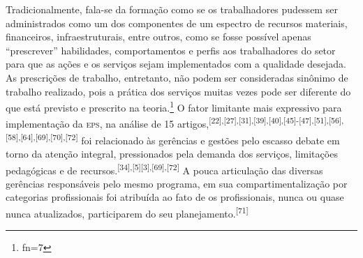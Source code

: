\documentclass{article}
\makeatletter
\newcommand{\fn}{\afterassignment\fn@aux\count0=}
\newcommand{\fn@aux}{\csname fn\the\count0\endcsname}
\makeatother
\begin{document}
Tradicionalmente, fala-se da formação como se os trabalhadores pudessem ser
administrados como um dos componentes de um espectro de recursos materiais,
financeiros, infraestruturais, entre outros, como se fosse possível apenas
“prescrever” habilidades, comportamentos e perfis aos trabalhadores do setor
para que as ações e os serviços sejam implementados com a qualidade desejada. As
prescrições de trabalho, entretanto, não podem ser consideradas sinônimo de
trabalho realizado, pois a prática dos serviços muitas vezes pode ser diferente
do que está previsto e prescrito na teoria.\footnote{\fn7}
O fator limitante mais expressivo para implementação da \textsc{eps}, na análise de 15
artigos,\textsuperscript{[}\textsuperscript{22}\textsuperscript{]}\textsuperscript{,}\textsuperscript{[}\textsuperscript{27}\textsuperscript{]}\textsuperscript{,}\textsuperscript{[}\textsuperscript{31}\textsuperscript{]}\textsuperscript{,}\textsuperscript{[}\textsuperscript{39}\textsuperscript{]}\textsuperscript{,}\textsuperscript{[}\textsuperscript{40}\textsuperscript{]}\textsuperscript{,}\textsuperscript{[}\textsuperscript{45}\textsuperscript{]}\textsuperscript{-}\textsuperscript{[}\textsuperscript{47}\textsuperscript{]}\textsuperscript{,}\textsuperscript{[}\textsuperscript{51}\textsuperscript{]}\textsuperscript{,}\textsuperscript{[}\textsuperscript{56}\textsuperscript{]}\textsuperscript{,}\textsuperscript{[}\textsuperscript{58}\textsuperscript{]}\textsuperscript{,}\textsuperscript{[}\textsuperscript{64}\textsuperscript{]}\textsuperscript{,}\textsuperscript{[}\textsuperscript{69}\textsuperscript{]}\textsuperscript{,}\textsuperscript{[}\textsuperscript{70}\textsuperscript{]}\textsuperscript{,}\textsuperscript{[}\textsuperscript{72}\textsuperscript{]}
foi relacionado às gerências e gestões pelo escasso debate em torno da atenção
integral, pressionados pela demanda dos serviços, limitações pedagógicas e de
recursos.\textsuperscript{[}\textsuperscript{34}\textsuperscript{]}\textsuperscript{,}\textsuperscript{[}\textsuperscript{5}\textsuperscript{]}\textsuperscript{[}\textsuperscript{3}\textsuperscript{]}\textsuperscript{,}\textsuperscript{[}\textsuperscript{69}\textsuperscript{]}\textsuperscript{,}\textsuperscript{[}\textsuperscript{72}\textsuperscript{]}
A pouca articulação das diversas gerências responsáveis pelo mesmo programa, em
sua compartimentalização por categorias profissionais foi atribuída ao fato de
os profissionais, nunca ou quase nunca atualizados, participarem do seu
planejamento.\textsuperscript{[}\textsuperscript{71}\textsuperscript{]}
\end{document}
